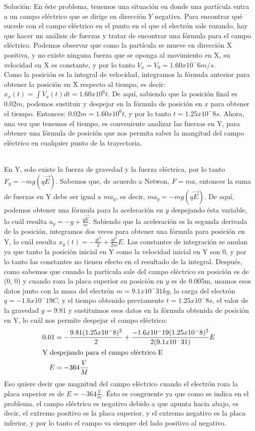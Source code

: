 \documentclass[12pt, letterpaper]{report}
\begin{document}
Solución: 
En éste problema, tenemos una situación en donde una partícula entra a un campo eléctrico que se dirige en dirección $Y$ negativa. Para encontrar qué sucede 
con el campo eléctrico en el punto en el que el electrón sale rozando, hay que hacer un análisis de fuerzas y tratar de encontrar una fórmula para el campo eléctrico. Podemos observar que 
como la partícula se mueve en dirección X positiva, y no existe ninguna fuerza que se oponga al movimiento en X, su velocidad en X es constante, y por lo tanto $V_x = V_0 = 1.60x10^-6m/s$. \\

Como la posición es la integral de velocidad, integramos la fórmula anterior para obtener la posición en X respecto al tiempo, es decir: $x_x(t) = \int V_x(t)dt = 1.60x10^6t$. De aquí, sabiendo que 
la posición final es $0.02m$, podemos sustituir y despejar en la fórmula de posición en $x$ para obtener el tiempo. Entonces: $0.02m = 1.60x10^6 t$, y por lo tanto $t = 1.25x10^-8s$. Ahora, una vez que tenemos el tiempo, es conveniente analizar las fuerzas 
en Y, para obtener una fórmula de posición que nos permita saber la mangitud del campo eléctrico en cualquier punto de la trayectoria. \\ 

En Y, solo existe la fuerza de gravedad y la fuerza eléctrica, por lo tanto $F_y = -mg(q\vec{E})$. Sabemos que, de acuerdo a Netwon, $F = ma$, entonces la suma de fuerzas en Y debe ser igual a $ma_y$, es decir, $ma_y = -mg(q\vec{E})$. De aquí, podemos obtener 
una fórmula para la aceleración en $y$ despejando ésta variable, lo cuál resulta $a_y = -g + \frac{q\vec{E}}{m}$. Sabiendo que la aceleración es la segunda derivada de la posición, integramos dos veces 
para obtener una fórmula para posición en Y, lo cuál resulta $x_y(t) = -\frac{gt^2}{2} + \frac{qt^2}{2m}E$. Las constantes de integración se anulan ya que tanto la posición inicial en Y como la 
velocidad inicial en Y son 0, y por lo tanto las constantes no tienen efecto en el resultado de la integral. Después, como sabemos que cuando la partícula sale del campo eléctrico su posición es de 
(0, 0) y cuando roza la placa superior su posición en $y$ es de 0.005m, usamos esos datos junto con la masa del electrón $m = 9.1x10^-31 kg$, la carga del electrón $q = -1.6x10^-19 C$, y el tiempo obtenido 
previamente $t = 1.25x10^-8s$, el valor de la gravedad $g = 9.81$ y sustituimos esos datos en la fórmula obtenida de posición en Y, lo cuál nos permite despejar el campo eléctrico: 
\begin{align}
0.01 &= -\frac{9.81(1.25x10^-8)^2}{2}+\frac{-1.6x10^-19(1.25x10^-8)^2}{2(9.1x10^-31)}E\\
\intertext{Y despejando para el campo eléctrico E}
E &= -364 \frac{V}{M}
\end{align}Eso quiere decir que magnitud del campo eléctrico cuando el electrón roza la placa superior es de $E = -364 \frac{V}{m}$. Ésto es congruente ya que 
como se indica en el problema, el campo eléctrico es negativo debido a que apunta hacia abajo, es decir, el extremo positivo es la placa superior, y el extremo negativo es la placa inferior, y por lo tanto 
el campo va siempre del lado positivo al negativo. \\ 
\end{document}
